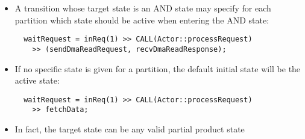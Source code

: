 \begin{frame}[fragile=singleslide]
\begin{itemize}
\item A transition whose target state is an AND state may specify for each partition which state should be active when entering the AND state:
\begin{lstlisting}
  waitRequest = inReq(1) >> CALL(Actor::processRequest)
    >> (sendDmaReadRequest, recvDmaReadResponse);
\end{lstlisting}
\item If no specific state is given for a partition, the default initial state will be the active state:
\begin{lstlisting}
  waitRequest = inReq(1) >> CALL(Actor::processRequest)
    >> fetchData;
\end{lstlisting}
\item In fact, the target state can be any valid partial product state
\end{itemize}
\end{frame}
